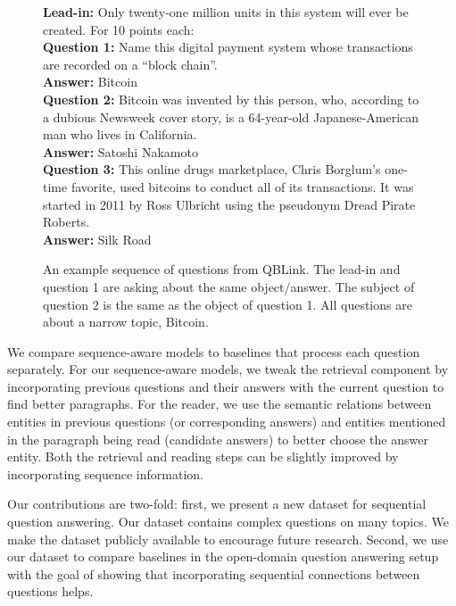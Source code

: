 \begin{figure}[t!]
\begin{framed}
\small
\textbf{Lead-in:} Only twenty-one million units in this system will ever be created. For 10 points each:\\
\textbf{Question 1:} Name this digital payment system whose transactions are recorded on a ``block chain''.\\
 \textbf{Answer:} Bitcoin\\
\textbf{Question 2:} Bitcoin was invented by this person, who, according to a dubious Newsweek cover story, is a 64-year-old Japanese-American man who lives in California.\\
\textbf{Answer:} Satoshi Nakamoto\\
\textbf{Question 3:} This online drugs marketplace, Chris Borglum's one-time favorite, used bitcoins to conduct all of its transactions. It was started in 2011 by Ross Ulbricht using the pseudonym Dread Pirate Roberts.\\
\textbf{Answer:} Silk Road\\
\label{framed:example}
\end{framed}
\caption{An example sequence of questions from QBLink. The lead-in and
question 1 are asking about the same object/answer. The subject of question 2 is
the same as the object of question 1. All questions are about a narrow 
topic, Bitcoin.}

      
\label{fig:example}
\end{figure}







We compare sequence-aware models to baselines that process each
question separately. For our sequence-aware models, we tweak the
retrieval component by incorporating previous questions and their
answers with the current question to find better paragraphs.  For the
reader, we use the semantic relations between entities in previous
questions (or corresponding answers) and entities mentioned in
the paragraph being read (candidate answers) to better choose the
answer entity.  Both the retrieval and reading steps can be slightly
improved by incorporating sequence information.

Our contributions are two-fold: first, we present a new dataset for
sequential question answering. Our dataset contains complex questions
on many topics. We make the dataset publicly available to encourage
future research.  Second, we use our dataset to compare baselines in
the open-domain question answering setup with the goal of showing that
incorporating sequential connections between questions helps.

